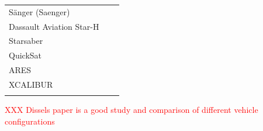 \begin{xltabular}{\linewidth}{|X|X|X|}
	\\
	\hline \small 
	S{\"a}nger (Saenger)
	&\small
	&\small
	\\
	\hline \small 
	Dassault Aviation Star-H
	
	
	&\small
	&\small
	\\
	\hline \small 
	Starsaber
	&\small
	&\small
	\\
	\hline \small 
	QuickSat
	&\small
	&\small
	\\
	\hline \small 
	ARES
	&\small
	&\small
	\\
	\hline \small 
	XCALIBUR
	&\small
	&\small
	\\
	\hline \small 
	&\small
	&\small
	\\
\hline 
\end{xltabular} 	

\textcolor{red}{XXX Dissels paper is a good study and comparison of different vehicle configurations}

